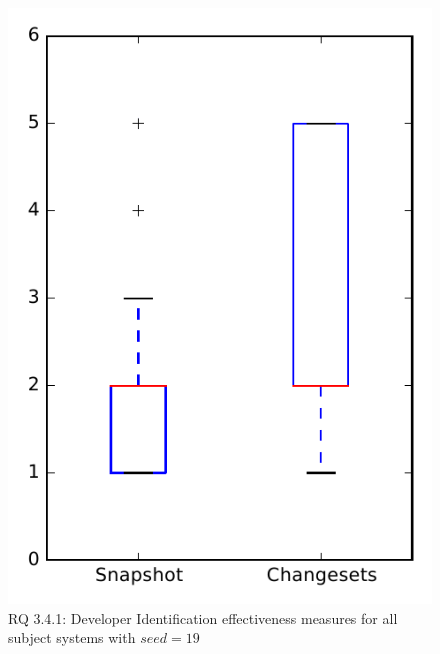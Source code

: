 
\begin{figure}
\centering
\includegraphics[height=0.4\textheight]{figures/dit_seed/rq1_overview_19}
\caption{RQ 3.4.1: Developer Identification effectiveness measures for all subject systems with $seed=19$}
\label{fig:dit_seed:rq1:overview}
\end{figure}
